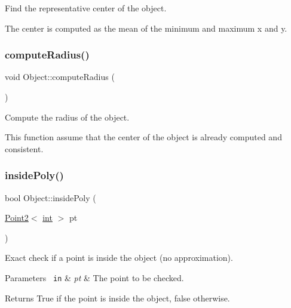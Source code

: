 Find the representative center of the object. 

The center is computed as the mean of the minimum and maximum x and y. \mbox{\label{class_object_a520dcca66f8a8075559b3a45a7a2d81a}} 
\subsubsection{\texorpdfstring{computeRadius()}{computeRadius()}}
{\footnotesize\ttfamily void Object\+::compute\+Radius (\begin{DoxyParamCaption}{ }\end{DoxyParamCaption})}



Compute the radius of the object. 

This function assume that the center of the object is already computed and consistent. \mbox{\label{class_object_a8f54d70eb539d4ea2d05993cfd51fcc9}} 
\subsubsection{\texorpdfstring{insidePoly()}{insidePoly()}}
{\footnotesize\ttfamily bool Object\+::inside\+Poly (\begin{DoxyParamCaption}\item[{\mbox{\hyperlink{class_point2}{Point2}}$<$ \mbox{\hyperlink{draw_8hh_aa620a13339ac3a1177c86edc549fda9b}{int}} $>$}]{pt }\end{DoxyParamCaption})}



Exact check if a point is inside the object (no approximation). 


\begin{DoxyParams}[1]{Parameters}
\mbox{\texttt{ in}}  & {\em pt} & The point to be checked. \\
\hline
\end{DoxyParams}
\begin{DoxyReturn}{Returns}
True if the point is inside the object, false otherwise. 
\end{DoxyReturn}
\mbox{\label{class_object_a5dd7d9cd5bd29176b04ab10d7577fc56}} 
